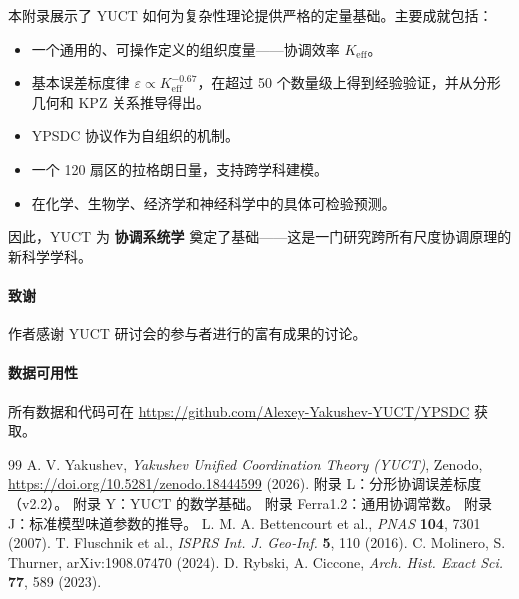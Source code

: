 \documentclass[11pt]{article}
\theoremstyle{remark}
\newcommand{\Keff}{K_{\mathrm{eff}}}
\begin{document}
	本附录展示了 YUCT 如何为复杂性理论提供严格的定量基础。主要成就包括：
	\begin{itemize}
		\item 一个通用的、可操作定义的组织度量——协调效率 \(\Keff\)。
		\item 基本误差标度律 \(\varepsilon \propto \Keff^{-0.67}\)，在超过 50 个数量级上得到经验验证，并从分形几何和 KPZ 关系推导得出。
		\item YPSDC 协议作为自组织的机制。
		\item 一个 120 扇区的拉格朗日量，支持跨学科建模。
		\item 在化学、生物学、经济学和神经科学中的具体可检验预测。
	\end{itemize}
	
	因此，YUCT 为 \textbf{协调系统学} 奠定了基础——这是一门研究跨所有尺度协调原理的新科学学科。
	
	\paragraph*{致谢}
	作者感谢 YUCT 研讨会的参与者进行的富有成果的讨论。
	
	\paragraph*{数据可用性}
	所有数据和代码可在 \url{https://github.com/Alexey-Yakushev-YUCT/YPSDC} 获取。
	
	\begin{thebibliography}{99}
		 A. V. Yakushev, \emph{Yakushev Unified Coordination Theory (YUCT)}, Zenodo, \url{https://doi.org/10.5281/zenodo.18444599} (2026).
		 附录 L：分形协调误差标度（v2.2）。
		 附录 Y：YUCT 的数学基础。
		 附录 Ferra1.2：通用协调常数。
		 附录 J：标准模型味道参数的推导。
		 L. M. A. Bettencourt et al., \emph{PNAS} \textbf{104}, 7301 (2007).
		 T. Fluschnik et al., \emph{ISPRS Int. J. Geo‑Inf.} \textbf{5}, 110 (2016).
		 C. Molinero, S. Thurner, arXiv:1908.07470 (2024).
		 D. Rybski, A. Ciccone, \emph{Arch. Hist. Exact Sci.} \textbf{77}, 589 (2023).
	\end{thebibliography}
	
\end{document}
